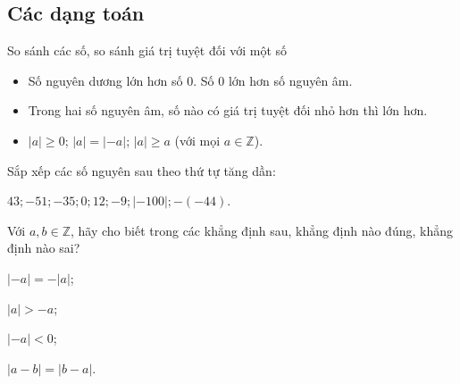 \subsection{Các dạng toán}
\begin{dang}{So sánh các số, so sánh giá trị tuyệt đối với một số}
\begin{itemize}
	\item Số nguyên dương lớn hơn số $0$. Số $0$ lớn hơn số nguyên âm.
	\item Trong hai số nguyên âm, số nào có giá trị tuyệt đối nhỏ hơn thì lớn hơn.
	\item $|a| \ge 0$; $|a|=|-a|$; $|a| \ge a$ (với mọi $a \in  \mathbb{Z}$).
\end{itemize}
\end{dang}
\begin{vd}%
Sắp xếp các số nguyên sau theo thứ tự tăng dần$\colon$
\begin{center}
	$43; -51; -35; 0; 12; -9; |-100|; -(-44)$.
\end{center}
\end{vd}
\begin{vd}%
Với $a, b \in \mathbb{Z}$, hãy cho biết trong các khẳng định sau, khẳng định nào đúng, khẳng định nào sai?
\begin{enumEX}{2}
	\item $|-a|=-|a|$;
	\item $|a| > -a$;
	\item $|-a| < 0$;
	\item $|a-b|=|b-a|$.
\end{enumEX}
\end{vd}
